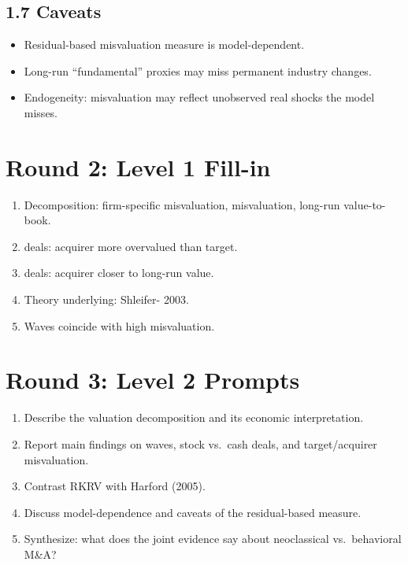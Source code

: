 \documentclass[11pt]{article}
\newcommand{\blank}[1]{\underline{\hspace{#1}}}
\begin{document}
\subsection*{1.7 Caveats}
\begin{alertbox}
\begin{itemize}
\item Residual-based misvaluation measure is model-dependent.
\item Long-run ``fundamental'' proxies may miss permanent industry changes.
\item Endogeneity: misvaluation may reflect unobserved real shocks the model misses.
\end{itemize}
\end{alertbox}

\section*{Round 2: Level 1 Fill-in}
\begin{enumerate}
\item Decomposition: firm-specific misvaluation, \blank{2cm} misvaluation, long-run value-to-book.
\item \blank{1cm} deals: acquirer more overvalued than target.
\item \blank{1cm} deals: acquirer closer to long-run value.
\item Theory underlying: Shleifer-\blank{1cm} 2003.
\item Waves coincide with high \blank{2cm} misvaluation.
\end{enumerate}

\section*{Round 3: Level 2 Prompts}
\begin{enumerate}
\item Describe the valuation decomposition and its economic interpretation.
\item Report main findings on waves, stock vs.\ cash deals, and target/acquirer misvaluation.
\item Contrast RKRV with Harford (2005).
\item Discuss model-dependence and caveats of the residual-based measure.
\item Synthesize: what does the joint evidence say about neoclassical vs.\ behavioral M\&A?
\end{enumerate}
\end{document}

